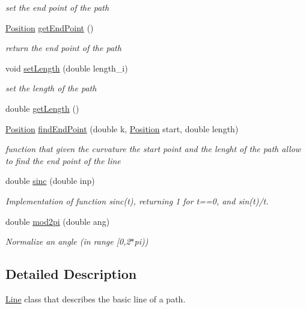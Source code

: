 \begin{DoxyCompactItemize}
\begin{DoxyCompactList}\small\item\em set the end point of the path \end{DoxyCompactList}\item 
\mbox{\hyperlink{class_position}{Position}} \mbox{\hyperlink{class_line_a5f22705f0019c1f855f095ea6b7c4b45}{get\+End\+Point}} ()
\begin{DoxyCompactList}\small\item\em return the end point of the path \end{DoxyCompactList}\item 
void \mbox{\hyperlink{class_line_a387afc9536a3c054dec9eb54f45ea993}{set\+Length}} (double length\+\_\+i)
\begin{DoxyCompactList}\small\item\em set the length of the path \end{DoxyCompactList}\item 
double \mbox{\hyperlink{class_line_a9f91895c2a71dcb2c8da5dd5b057b14a}{get\+Length}} ()
\item 
\mbox{\hyperlink{class_position}{Position}} \mbox{\hyperlink{class_line_ad19714c8b94997c96d35fefaa2bbda26}{find\+End\+Point}} (double k, \mbox{\hyperlink{class_position}{Position}} start, double length)
\begin{DoxyCompactList}\small\item\em function that given the curvature the start point and the lenght of the path allow to find the end point of the line \end{DoxyCompactList}\item 
double \mbox{\hyperlink{class_line_a4976ad80d3fe4a789bac7a1916543edd}{sinc}} (double inp)
\begin{DoxyCompactList}\small\item\em Implementation of function sinc(t), returning 1 for t==0, and sin(t)/t. \end{DoxyCompactList}\item 
double \mbox{\hyperlink{class_line_aa30f3bd50c4de544874c4aaad0a24c6a}{mod2pi}} (double ang)
\begin{DoxyCompactList}\small\item\em Normalize an angle (in range \mbox{[}0,2$\ast$pi)) \end{DoxyCompactList}\end{DoxyCompactItemize}


\subsection{Detailed Description}
\mbox{\hyperlink{class_line}{Line}} class that describes the basic line of a path. 

